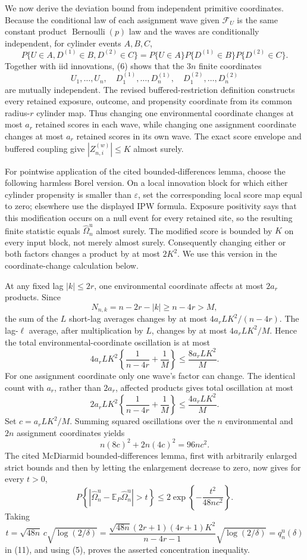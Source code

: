 We now derive the deviation bound from independent primitive coordinates.  Because the conditional law of each assignment wave given \(\mathcal F_U\) is the same constant product \(\operatorname{Bernoulli}(p)\) law and the waves are conditionally independent, for cylinder events \(A,B,C\),
\[
 P\{U\in A,D^{(1)}\in B,D^{(2)}\in C\}
 =P\{U\in A\}P\{D^{(1)}\in B\}P\{D^{(2)}\in C\}. \tag{6}
\]
Together with iid innovations, (6) shows that the \(3n\) finite coordinates
\[
 U_1,\ldots,U_n,
 \quad D_1^{(1)},\ldots,D_n^{(1)},
 \quad D_1^{(2)},\ldots,D_n^{(2)}
\]
are mutually independent.  The revised buffered-restriction definition constructs every retained exposure, outcome, and propensity coordinate from its common radius-\(r\) cylinder map.  Thus changing one environmental coordinate changes at most \(a_r\) retained scores in each wave, while changing one assignment coordinate changes at most \(a_r\) retained scores in its own wave.  The exact score envelope and buffered coupling give \(|Z_{n,i}^{(w)}|\le K\) almost surely.

For pointwise application of the cited bounded-differences lemma, choose the following harmless Borel version.  On a local innovation block for which either cylinder propensity is smaller than \(\varepsilon\), set the corresponding local score map equal to zero; elsewhere use the displayed IPW formula.  Exposure positivity says that this modification occurs on a null event for every retained site, so the resulting finite statistic equals \(\widehat\Omega_n^{\mathrm u}\) almost surely.  The modified score is bounded by \(K\) on every input block, not merely almost surely.  Consequently changing either or both factors changes a product by at most \(2K^2\).  We use this version in the coordinate-change calculation below.

At any fixed lag \(|k|\le2r\), one environmental coordinate affects at most \(2a_r\) products.  Since
\[
 N_{n,k}=n-2r-|k|\ge n-4r>M, \tag{7}
\]
the sum of the \(L\) short-lag averages changes by at most \(4a_rLK^2/(n-4r)\).  The lag-\(\ell\) average, after multiplication by \(L\), changes by at most \(4a_rLK^2/M\).  Hence the total environmental-coordinate oscillation is at most
\[
 4a_rLK^2\left\{\frac1{n-4r}+\frac1M\right\}
 \le \frac{8a_rLK^2}{M}. \tag{8}
\]
For one assignment coordinate only one wave's factor can change.  The identical count with \(a_r\), rather than \(2a_r\), affected products gives total oscillation at most
\[
 2a_rLK^2\left\{\frac1{n-4r}+\frac1M\right\}
 \le \frac{4a_rLK^2}{M}. \tag{9}
\]
Set \(c=a_rLK^2/M\).  Summing squared oscillations over the \(n\) environmental and \(2n\) assignment coordinates yields
\[
 n(8c)^2+2n(4c)^2=96nc^2. \tag{10}
\]
The cited McDiarmid bounded-differences lemma, first with arbitrarily enlarged strict bounds and then by letting the enlargement decrease to zero, now gives for every \(t>0\),
\[
 P\!\left\{
  \left|\widehat\Omega_n^{\mathrm u}
  -\mathbb E_P\widehat\Omega_n^{\mathrm u}\right|>t
 \right\}
 \le2\exp\!\left\{-\frac{t^2}{48nc^2}\right\}. \tag{11}
\]
Taking
\[
 t=\sqrt{48n}\,c\sqrt{\log(2/\delta)}
 =\frac{\sqrt{48n}(2r+1)(4r+1)K^2}{n-4r-1}
  \sqrt{\log(2/\delta)}
 =q_n^{\mathrm u}(\delta) \tag{12}
\]
in (11), and using (5), proves the asserted concentration inequality.

